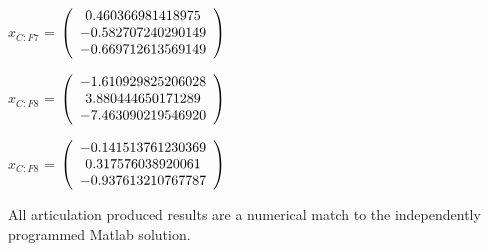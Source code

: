 \begin{description}
$\hat{x}_{C:F7}$  = $\left( \begin{array} {ccc} 0.460366981418975 \\ -0.582707240290149 \\ -0.669712613569149
\end{array} \right)\\ \\$

$x_{C:F8}$  = $\left( \begin{array} {ccc} -1.610929825206028 \\ 3.880444650171289 \\ -7.463090219546920
\end{array} \right)\\ \\$

$\hat{x}_{C:F8}$  = $\left( \begin{array} {ccc} -0.141513761230369 \\ 0.317576038920061 \\ -0.937613210767787
\end{array} \right)\\ \\$

All \ModelDesc articulation produced results are a numerical match to the
independently programmed Matlab solution.


\end{description}

\label{test:art_test_6}

